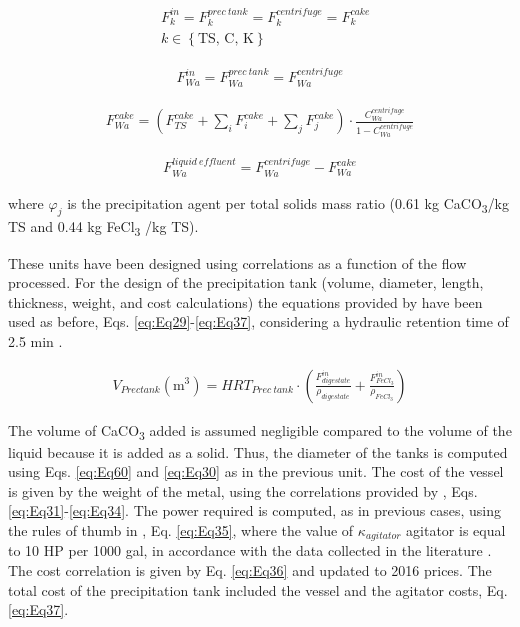 \begin{refsection}[referencesCh2]
\begin{align}
	& F_k^{in} = F_k^{prec \ tank} = F_k^{centrifuge} = F_k^{cake} \label{eq:Eq56} \\
	& {k} \in \left\{ \text{TS, C, K} \right\} \nonumber
\end{align}

\begin{align}
	F_{Wa}^{in} = F_{Wa}^{prec \ tank} = F_{Wa}^{centrifuge} \label{eq:Eq57}
\end{align}

\begin{align}
	{F}_{Wa}^{cake} = \left( {F}_{TS}^{cake} + \sum\limits_i {F}_i^{cake} + \sum\limits_j {F}_j^{cake} \right) \cdot \frac{C_{Wa}^{centrifuge}}{1 - C_{Wa}^{centrifuge}} \label{eq:Eq58}
\end{align}

\begin{align}
	{F}_{Wa}^{liquid \ effluent} = F_{Wa}^{centrifuge} - {F}_{Wa}^{cake} \label{eq:Eq59}
\end{align}

where $\varphi _{j}$ is the precipitation agent per total solids mass ratio (0.61 kg CaCO\textsubscript{3}/kg TS and 0.44 kg FeCl\textsubscript{3} /kg TS).

These units have been designed using correlations as a function of the flow processed. For the design of the precipitation tank (volume, diameter, length, thickness, weight, and cost calculations) the equations provided by \citet{almena2016technoeconomic} have been used as before, Eqs. \ref{eq:Eq29}-\ref{eq:Eq37}, considering a hydraulic retention time of 2.5 min \citep{szabo2008significance}.

\begin{align}
	{V}_{Prec tank} \left( \text{m}^{3} \right) = HRT_{Prec \ tank} \cdot \left( \frac{F_{digestate}^{in}}{\rho_{digestate}} + \frac{F_{FeCl_{3}}^{in}}{\rho _{FeCl_{3}}} \right) \label{eq:Eq60}
\end{align}

The volume of CaCO\textsubscript{3} added is assumed negligible compared to the volume of the liquid because it is added as a solid. Thus, the diameter of the tanks is computed using Eqs. \ref{eq:Eq60} and \ref{eq:Eq30} as in the previous unit. The cost of the vessel is given by the weight of the metal, using the correlations provided by \citep{almena2016technoeconomic}, Eqs. \ref{eq:Eq31}-\ref{eq:Eq34}. The power required is computed, as in previous cases, using the rules of thumb in \citep{walas1988chemical}, Eq. \ref{eq:Eq35}, where the value of $\kappa_{agitator}$ agitator is equal to 10 HP per 1000 gal, in accordance with the data collected in the literature \citet{walas1988chemical}. The cost correlation is given by Eq. \ref{eq:Eq36} and updated to 2016 prices. The total cost of the precipitation tank included the vessel and the agitator costs, Eq. \ref{eq:Eq37}.


\end{refsection}
